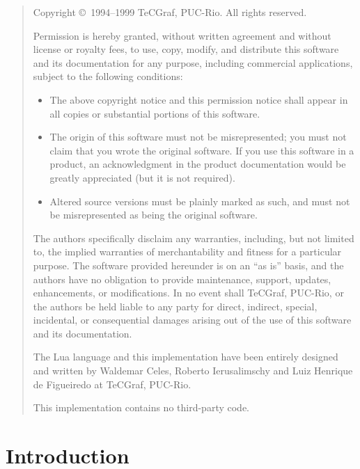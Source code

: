 \documentclass[11pt]{article}
\begin{document}
\newpage
\begin{quotation}
\noindent
\footnotesize
Copyright \copyright\ 1994--1999 TeCGraf, PUC-Rio.  All rights reserved.

\noindent
Permission is hereby granted, without written agreement and without license
or royalty fees, to use, copy, modify, and distribute this software and its
documentation for any purpose, including commercial applications, subject to
the following conditions:
\begin{itemize}
\item The above copyright notice and this permission notice shall appear in all
   copies or substantial portions of this software.

\item The origin of this software must not be misrepresented; you must not
   claim that you wrote the original software. If you use this software in a
   product, an acknowledgment in the product documentation would be greatly
   appreciated (but it is not required).

\item Altered source versions must be plainly marked as such, and must not be
   misrepresented as being the original software.
\end{itemize}
The authors specifically disclaim any warranties, including, but not limited
to, the implied warranties of merchantability and fitness for a particular
purpose.  The software provided hereunder is on an ``as is'' basis, and the
authors have no obligation to provide maintenance, support, updates,
enhancements, or modifications.  In no event shall TeCGraf, PUC-Rio, or the
authors be held liable to any party for direct, indirect, special,
incidental, or consequential damages arising out of the use of this software
and its documentation.

\noindent
The Lua language and this implementation have been entirely designed and 
written by Waldemar Celes, Roberto Ierusalimschy and Luiz Henrique de 
Figueiredo at TeCGraf, PUC-Rio.

\noindent
This implementation contains no third-party code.
\end{quotation} 

\newpage

\tableofcontents

\newpage
\setcounter{page}{1}
\pagestyle{plain}


\section{Introduction}
\end{document}

